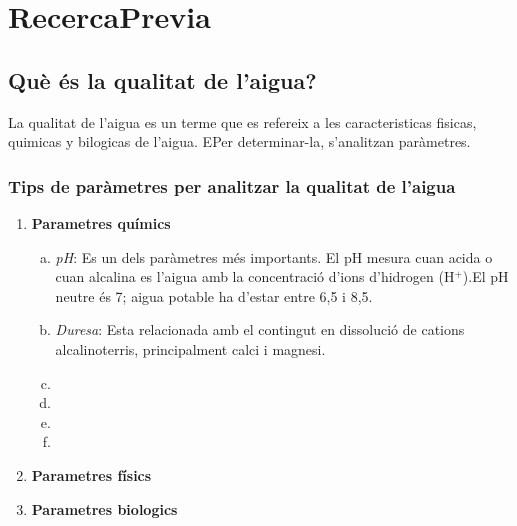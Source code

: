\chapter{RecercaPrevia}

\section{Què és la qualitat de l’aigua?}
La qualitat de l'aigua es un terme que es refereix a les caracteristicas fisicas, quimicas y bilogicas de l'aigua. EPer determinar-la, s'analitzan paràmetres.
\subsection{Tips de paràmetres per analitzar la qualitat de l'aigua}
\begin{enumerate}[1)]
 \item \textbf{Parametres químics}
 \begin{enumerate}[a)]
  \item \textit{pH}: Es un dels paràmetres més importants. El pH mesura cuan acida o cuan alcalina es l'aigua amb la concentració d’ions d’hidrogen (H$^+$).El pH neutre és 7; aigua potable ha d’estar entre 6,5 i 8,5.
  \item \textit{Duresa}: Esta relacionada amb el contingut en dissolució de cations alcalinoterris, principalment calci i magnesi.
  \item
  \item
  \item
  \item

 \end{enumerate}

 \item \textbf{Parametres físics}
 \item \textbf{Parametres biologics}
\end{enumerate}


